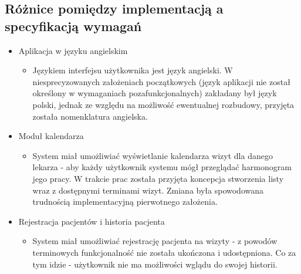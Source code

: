 \subsection{Różnice pomiędzy implementacją a specyfikacją wymagań}


\begin{itemize}
	\item Aplikacja w języku angielskim
	\begin{itemize}
		\item Językiem interfejsu użytkownika jest język angielski. W niesprecyzowanych założeniach początkowych (język aplikacji nie został określony w wymaganiach pozafunkcjonalnych) zakładany był język polski, jednak ze względu na możliwość ewentualnej rozbudowy, przyjęta została nomenklatura angielska.
	\end{itemize}
	\item Moduł kalendarza
	\begin{itemize}
		\item System miał umożliwiać wyświetlanie kalendarza wizyt dla danego lekarza - aby każdy użytkownik systemu mógł przeglądać harmonogram jego pracy. W trakcie prac została przyjęta koncepcja stworzenia listy wraz z dostępnymi terminami wizyt. Zmiana była spowodowana trudnością implementacyjną pierwotnego założenia.
	\end{itemize}
	
		\item Rejestracja pacjentów i historia pacjenta
	\begin{itemize}
		\item System miał umożliwiać rejestrację pacjenta na wizyty - z powodów terminowych funkcjonalność nie została ukończona i udostępniona. Co za tym idzie - użytkownik nie ma możliwości wglądu do swojej historii.
	\end{itemize}
	


\end{itemize}


